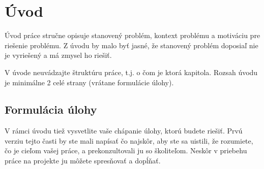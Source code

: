 
\chapter{Úvod}\label{ch:introduction}


Úvod práce stručne opisuje stanovený problém, kontext problému a motiváciu pre riešenie problému. Z úvodu by malo byť jasné, že stanovený problém doposiaľ nie je vyriešený a má zmysel ho riešiť.

V úvode neuvádzajte štruktúru práce, t.j. o čom je ktorá kapitola. Rozsah úvodu je minimálne 2 celé strany (vrátane formulácie úlohy).

\section*{Formulácia úlohy}

V rámci úvodu tiež vysvetlite vaše chápanie úlohy, ktorú budete riešiť. Prvú verziu tejto časti by ste mali napísať čo najskôr, aby ste sa uistili, že rozumiete, čo je cieľom vašej práce, a prekonzultovali ju so školiteľom. Neskôr v priebehu práce na projekte ju môžete spresňovať a dopĺňať.
